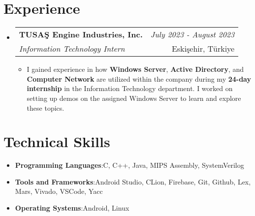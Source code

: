 \documentclass[a4paper,11pt]{article}
\makeatletter
\newcommand{\resumeItem}[2]{
    \item{\textbf{#1}{:\hspace{0.5mm}#2 \vspace{-0.5mm}}}
}
\newcommand{\resumeProject}[4]{
\vspace{0.5mm}\item
    \begin{tabular*}{0.98\textwidth}[t]{l@{\extracolsep{\fill}}r}
    \textbf{#1} & \textit{\footnotesize{#3}} \\
    \footnotesize{\textit{#2}} & \footnotesize{#4}\end{tabular*}\vspace{-2.4mm}
}
\newcommand{\resumeSubItem}[2]{\resumeItem{#1}{#2}\vspace{-4pt}}
\newcommand{\resumeSubHeadingListStart}{\begin{itemize}[leftmargin=*,labelsep=0mm]}
\newcommand{\resumeHeadingSkillStart}{\begin{itemize}[leftmargin=*,itemsep=1.7mm, rightmargin=2ex]}
\newcommand{\resumeItemListStart}{\begin{justify}\begin{itemize}[leftmargin=3ex, rightmargin=2ex, noitemsep,labelsep=1.2mm,itemsep=0mm]\small}
\newcommand{\resumeSubHeadingListEnd}{\end{itemize}\vspace{2mm}}
\newcommand{\resumeHeadingSkillEnd}{\end{itemize}\vspace{-2mm}}
\newcommand{\resumeItemListEnd}{\end{itemize}\end{justify}\vspace{-2mm}}
\makeatother
\begin{document}
\section{\textbf{Experience}}
    \resumeSubHeadingListStart
        \resumeProject
            {TUSAŞ Engine Industries, Inc.} {Information Technology Intern}
            {July 2023 - August 2023} {Eskişehir, Türkiye}
                \resumeItemListStart
                    \item {I gained experience in how {\textbf{Windows Server}}, {\textbf{Active Directory}}, and {\textbf{Computer Network}} are utilized within the company during my {\textbf{24-day internship}} in the Information Technology department. I worked on setting up demos on the assigned Windows Server to learn and explore these topics.}
                \resumeItemListEnd
    \resumeSubHeadingListEnd
\vspace{-6.5mm}


\section{\textbf{Technical Skills}}
    \resumeHeadingSkillStart
        \resumeSubItem{Programming Languages}
            {C, C++, Java, MIPS Assembly, SystemVerilog}
        \resumeSubItem{Tools and Frameworks}
            {Android Studio, CLion, Firebase, Git, Github, Lex, Mars, Vivado, VSCode, Yacc}
        \resumeSubItem{Operating Systems}
            {Android, Linux}
    \resumeHeadingSkillEnd
\vspace{-1.5mm}

\end{document}
